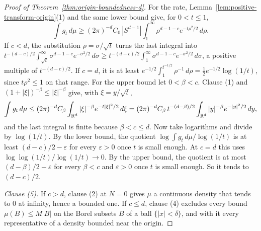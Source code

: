 \begin{proof}[Proof of Theorem~\ref{thm:origin-boundedness-d}]
For the rate, Lemma~\ref{lem:positive-transform-origin}(1) and the same lower bound give, for
$0 < t \le 1$,
\[
  \int g_t\,d\mu \ge (2\pi)^{-d}C_0\,|S^{d-1}|\int_1^\infty \rho^{d-1-c}e^{-t\rho^2/2}\,d\rho .
\]
If $c < d$, the substitution $\rho = \sigma/\sqrt t$ turns the last integral into
$t^{-(d-c)/2}\int_{\sqrt t}^\infty\sigma^{d-1-c}e^{-\sigma^2/2}\,d\sigma \ge
t^{-(d-c)/2}\int_1^\infty\sigma^{d-1-c}e^{-\sigma^2/2}\,d\sigma$, a positive multiple of
$t^{-(d-c)/2}$. If $c = d$, it is at least
$e^{-1/2}\int_1^{t^{-1/2}}\rho^{-1}\,d\rho = \tfrac12 e^{-1/2}\log(1/t)$, since
$t\rho^2 \le 1$ on that range. For the upper bound let $0 < \beta < c$. Clause (1) and
$(1+|\xi|)^{-\beta} \le |\xi|^{-\beta}$ give, with $\xi = y/\sqrt t$,
\[
  \int g_t\,d\mu \le (2\pi)^{-d}C_\beta\int_{\mathbb{R}^d}|\xi|^{-\beta}e^{-t|\xi|^2/2}\,d\xi
   = (2\pi)^{-d}C_\beta\,t^{-(d-\beta)/2}\int_{\mathbb{R}^d}|y|^{-\beta}e^{-|y|^2/2}\,dy ,
\]
and the last integral is finite because $\beta < c \le d$. Now take logarithms and divide by
$\log(1/t)$. By the lower bound, the quotient $\log\int g_t\,d\mu/\log(1/t)$ is at least
$(d-c)/2 - \varepsilon$ for every $\varepsilon > 0$ once $t$ is small enough. At $c = d$ this
uses $\log\log(1/t)/\log(1/t) \to 0$. By the upper bound, the quotient is at most
$(d-\beta)/2 + \varepsilon$ for every $\beta < c$ and $\varepsilon > 0$ once $t$ is small enough. So it
tends to $(d-c)/2$.

\emph{Clause (5).} If $c > d$, clause (2) at $N = 0$ gives $\mu$ a continuous density that tends
to $0$ at infinity, hence a bounded one. If $c \le d$, clause (4) excludes every bound
$\mu(B) \le M|B|$ on the Borel subsets $B$ of a ball $\{|x| < \delta\}$, and with it every
representative of a density bounded near the origin.
\end{proof}

